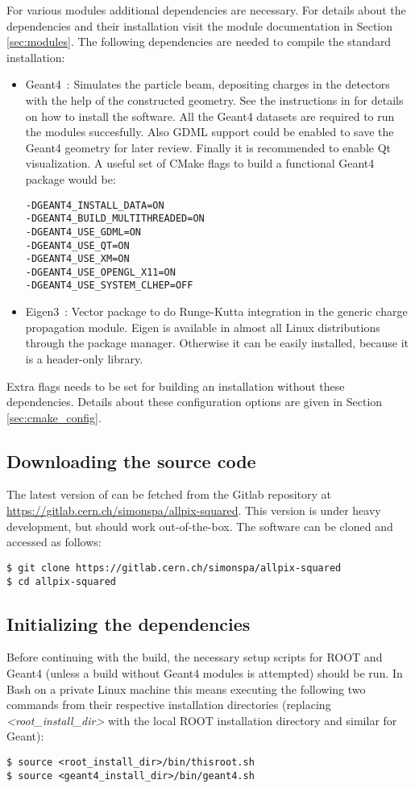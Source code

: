 For various modules additional dependencies are necessary. For details about the dependencies and their installation visit the module documentation in Section \ref{sec:modules}. The following dependencies are needed to compile the standard installation:
\begin{itemize}
\item Geant4~\cite{geant4}: Simulates the particle beam, depositing charges in the detectors with the help of the constructed geometry. See the instructions in \cite{geant4installation} for details on how to install the software. All the Geant4 datasets are required to run the modules succesfully. Also GDML support could be enabled to save the Geant4 geometry for later review. Finally it is recommended to enable Qt visualization. A useful set of CMake flags to build a functional Geant4 package would be:
\begin{verbatim}
-DGEANT4_INSTALL_DATA=ON
-DGEANT4_BUILD_MULTITHREADED=ON
-DGEANT4_USE_GDML=ON
-DGEANT4_USE_QT=ON
-DGEANT4_USE_XM=ON 
-DGEANT4_USE_OPENGL_X11=ON
-DGEANT4_USE_SYSTEM_CLHEP=OFF
\end{verbatim}
\item Eigen3~\cite{eigen3}: Vector package to do Runge-Kutta integration in the generic charge propagation module. Eigen is available in almost all Linux distributions through the package manager. Otherwise it can be easily installed, because it is a header-only library.
\end{itemize}
Extra flags needs to be set for building an \apsq installation without these dependencies. Details about these configuration options are given in Section \ref{sec:cmake_config}.

\subsection{Downloading the source code}
The latest version of \apsq can be fetched from the Gitlab repository at \url{https://gitlab.cern.ch/simonspa/allpix-squared}. This version is under heavy development, but should work out-of-the-box. The software can be cloned and accessed as follows:

\begin{verbatim}
$ git clone https://gitlab.cern.ch/simonspa/allpix-squared
$ cd allpix-squared
\end{verbatim}

\subsection{Initializing the dependencies}
\label{sec:initialize_dependencies}
Before continuing with the build, the necessary setup scripts for ROOT and Geant4 (unless a build without Geant4 modules is attempted) should be run. In Bash on a private Linux machine this means executing the following two commands from their respective installation directories (replacing \textit{\textless root\_install\_dir\textgreater} with the local ROOT installation directory and similar for Geant):
\begin{verbatim}
$ source <root_install_dir>/bin/thisroot.sh
$ source <geant4_install_dir>/bin/geant4.sh
\end{verbatim}


